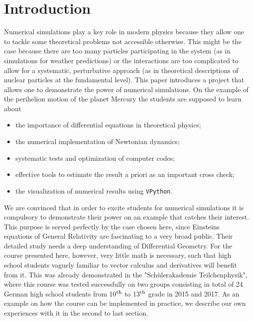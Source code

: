 \documentclass[12pt,ngerman,american]{iopart}
\newcommand{\vpython}[0]{\texttt{VPython}}
\begin{document}
\section{Introduction}\label{sec:intro}

Numerical simulations play a key role in modern physics because they allow one to tackle some theoretical problems not accessible otherwise. This might be the case because there are too many particles participating in the system (as in simulations for weather predictions) or the interactions are too complicated to allow for a systematic, perturbative approach (as in theoretical descriptions of nuclear particles at the fundamental level).
This paper introduces a project that allows one to demonstrate the power of numerical simulations.
On the example of the perihelion motion of the planet Mercury the students are supposed to learn about
\begin{itemize}
\item the importance of differential equations in theoretical physics;
\item the numerical implementation of Newtonian dynamics;
\item systematic tests and optimization of computer codes;
\item effective tools to estimate the result a priori as an important cross check;
\item the visualization of numerical results using \vpython{}.
\end{itemize}
We are convinced that in order to excite students for numerical simulations it is compulsory to demonstrate their power on an example that catches their interest.
This purpose is served perfectly by the case chosen here, since Einsteins equations of General Relativity are fascinating to a very broad public.
Their detailed study needs a deep understanding of Differential Geometry. For the course presented here, however, very little math is necessary, such that high school students vaguely familiar to vector calculus and derivatives will benefit from it.
This was already demonstrated in the "Sch\"ulerakademie Teilchenphysik", where this course was tested successfully on two groups consisting in total of 24 German high school students from 10$^{\rm th}$ to 13$^{\rm th}$ grade in 2015 and 2017. As an example on how the course can be implemented in practice, we describe our own
experiences with it in the second to last section.
\end{document}
